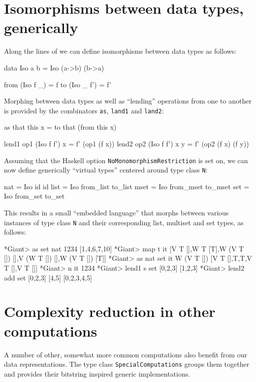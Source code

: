 \documentclass{TOOLS/llncs}
\begin{document}
\section{Isomorphisms between data types, generically} \label{iso}
Along the lines of \cite{everything} we can define
isomorphisms between data types as follows:
\begin{code}
data Iso a b = Iso (a->b) (b->a)

from (Iso f _) = f
to (Iso _ f') = f'
\end{code}
Morphing between data types as well as ``lending'' operations from
one to another is provided by the combinators {\tt as}, {\tt land1} and {\tt land2}:
\begin{code}
as that this x = to that (from this x)

lend1 op1 (Iso f f') x = f' (op1 (f x))
lend2 op2 (Iso f f') x y = f' (op2 (f x) (f y))
\end{code}
Assuming that the Haskell option {\tt NoMonomorphismRestriction} is set on, we can
now define generically ``virtual types'' centered around type class {\tt N}:
\begin{code}
nat = Iso id id
list = Iso from_list to_list
mset = Iso from_mset to_mset
set = Iso from_set to_set
\end{code}
This results in a small ``embedded language'' that morphs between
various instances of type class {\tt N} and their corresponding
list, multiset and set types, as follows:
\begin{codex}
*Giant> as set nat 1234
[1,4,6,7,10]
*Giant> map t it
[V T [],W T [T],W (V T []) [],V (W T []) [],W (V T []) [T]]
*Giant> as nat set it
W (V T []) [V T [],T,T,V T [],V T []]
*Giant> n it
1234
*Giant> lend1 s set [0,2,3]
[1,2,3]
*Giant> lend2 add set [0,2,3] [4,5]
[0,2,3,4,5]
\end{codex}




\section{Complexity reduction in other computations} \label{red}

A number of other, somewhat more common computations also benefit from our data representations.
The type class {\tt SpecialComputations} groups them together and provides their bitstring
inspired generic implementations.
\end{document}
